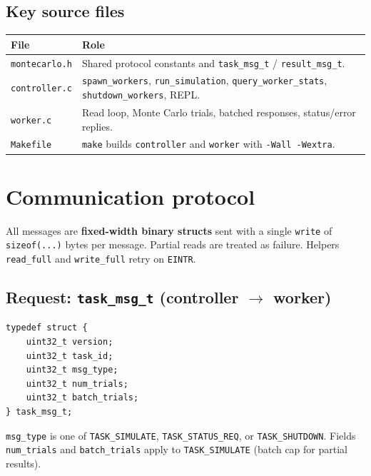 \documentclass[11pt]{article}
\begin{document}
\subsection{Key source files}
\begin{tabularx}{\linewidth}{lX}
  \toprule
  File & Role \\
  \midrule
  \texttt{montecarlo.h} & Shared protocol constants and \texttt{task\_msg\_t} / \texttt{result\_msg\_t}. \\
  \texttt{controller.c} & \texttt{spawn\_workers}, \texttt{run\_simulation}, \texttt{query\_worker\_stats}, \texttt{shutdown\_workers}, REPL. \\
  \texttt{worker.c} & Read loop, Monte Carlo trials, batched responses, status/error replies. \\
  \texttt{Makefile} & \texttt{make} builds \texttt{controller} and \texttt{worker} with \texttt{-Wall -Wextra}. \\
  \bottomrule
\end{tabularx}

\section{Communication protocol}
\label{sec:protocol}

All messages are \textbf{fixed-width binary structs} sent with a single \texttt{write} of \texttt{sizeof(...)} bytes per message. Partial reads are treated as failure. Helpers \texttt{read\_full} and \texttt{write\_full} retry on \texttt{EINTR}.

\subsection{Request: \texorpdfstring{\texttt{task\_msg\_t} (controller $\rightarrow$ worker)}{\texttt{task\_msg\_t} (controller to worker)}}
\begin{lstlisting}
typedef struct {
    uint32_t version;
    uint32_t task_id;
    uint32_t msg_type;
    uint32_t num_trials;
    uint32_t batch_trials;
} task_msg_t;
\end{lstlisting}
\texttt{msg\_type} is one of \texttt{TASK\_SIMULATE}, \texttt{TASK\_STATUS\_REQ}, or \texttt{TASK\_SHUTDOWN}. Fields \texttt{num\_trials} and \texttt{batch\_trials} apply to \texttt{TASK\_SIMULATE} (batch cap for partial results).
\end{document}

